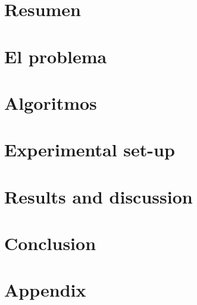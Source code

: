 \documentclass[a4paper,10pt,twoside]{report}
\author{\me}
\begin{document}


\normalsize

\chapter*{Resumen}\label{chapter:Resumen}
\setcounter{page}{0}


\tableofcontents

\chapter{El problema}\label{chapter:Introduction}
\setcounter{page}{0}


\chapter{Algoritmos}\label{chapter:Algorithms}


\chapter{Experimental set-up}\label{chapter:Experimental set-up}


\chapter{Results and discussion}\label{chapter:Results and discussion}


\chapter{Conclusion}\label{chapter:Conclusion}




\newpage

\appendix
{}
\chapter{Appendix}\label{chapter:Appendix A}

\end{document}
